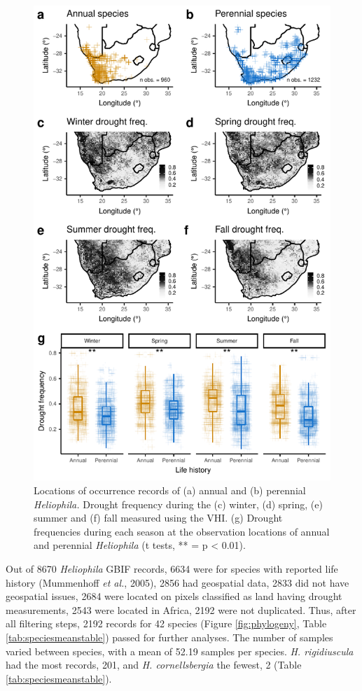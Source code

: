 \documentclass[man,floatsintext]{apa6}
\theoremstyle{definition}
\theoremstyle{definition}
\theoremstyle{definition}
\theoremstyle{remark}
\begin{document}
\begin{figure}[!h]
\includegraphics[width=\textwidth]{../figures/maps_boxplots} \caption{Locations of occurrence records of (a) annual and (b)
perennial \emph{Heliophila.} Drought frequency during the (c) winter,
(d) spring, (e) summer and (f) fall measured using the VHI. (g) Drought
frequencies during each season at the observation locations of annual
and perennial \emph{Heliophila} (t tests, ** = p \textless{} 0.01).}\label{fig:mapsboxplots}
\end{figure}

Out of 8670 \emph{Heliophila} GBIF records, 6634 were for species with
reported life history (Mummenhoff \emph{et al.}, 2005), 2856 had
geospatial data, 2833 did not have geospatial issues, 2684 were located
on pixels classified as land having drought measurements, 2543 were
located in Africa, 2192 were not duplicated. Thus, after all filtering
steps, 2192 records for 42 species (Figure \ref{fig:phylogeny}, Table
\ref{tab:speciesmeanstable}) passed for further analyses. The number of
samples varied between species, with a mean of 52.19 samples per
species. \emph{H. rigidiuscula} had the most records, 201, and \emph{H.
cornellsbergia} the fewest, 2 (Table \ref{tab:speciesmeanstable}).
\end{document}

